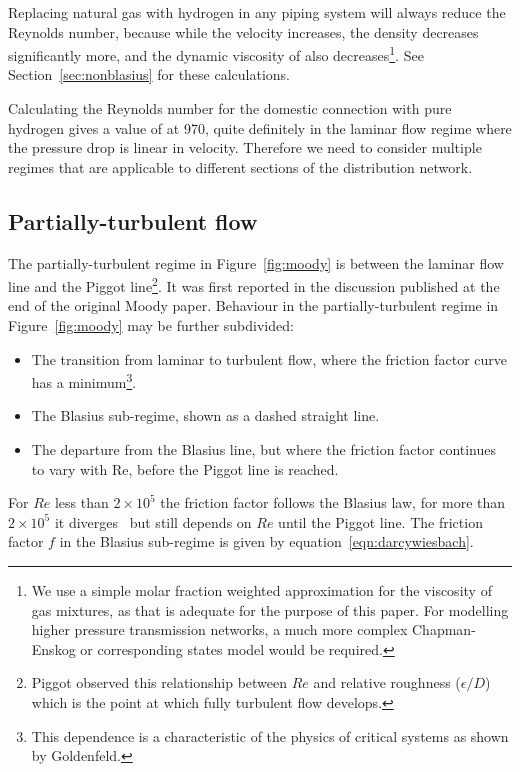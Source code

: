 \documentclass[5p]{elsarticle} %
\begin{document}
Replacing natural gas with hydrogen in any piping system will always reduce the Reynolds number, because while the velocity increases, the density decreases significantly more, and the dynamic viscosity of also decreases\footnote{We use a simple molar fraction weighted approximation for the viscosity of gas mixtures, as that is adequate for the purpose of this paper. For modelling higher pressure transmission networks, a much more complex Chapman-Enskog or corresponding states\citep{coolprop} model would be required.}.
See Section~\ref{sec:nonblasius} for these calculations.

Calculating the Reynolds number for the domestic connection with pure hydrogen gives a value of at 970, quite definitely in the laminar flow regime where the pressure drop is linear in velocity.
Therefore we need to consider multiple regimes that are applicable to different sections of the distribution network.

\subsection{Partially-turbulent flow}

The partially-turbulent regime in Figure~\ref{fig:moody} is between the laminar flow line and the 
Piggot line\footnote{Piggot observed this relationship between $Re$ and relative roughness ($\epsilon/D$) which is the point at which fully turbulent flow develops.}.
It was first reported in the discussion published at the end of the original Moody paper\citep{Moody1944}. 
Behaviour in the partially-turbulent regime in Figure~\ref{fig:moody} may be further subdivided:
\begin{itemize}
    \item The transition from laminar to turbulent flow, where the friction factor curve has a minimum\footnote{This dependence is a characteristic of the physics of critical systems as shown by Goldenfeld\citep{Goldenfeld2006}.}.
    \item The Blasius sub-regime, shown as a dashed straight line.
    \item The departure from the Blasius line, but where the friction factor continues to vary with Re, before the Piggot line is reached.
\end{itemize}

For $Re$ less than $2\times10^5$ the friction factor follows the Blasius law, for more than $2\times10^5$ it diverges~\cite{Allen2007} but still depends on $Re$ until the Piggot line.
The friction factor $f$ in the Blasius sub-regime is given by equation~\eqref{eqn:darcywiesbach}\citep{Bennet2017}.
\end{document}
